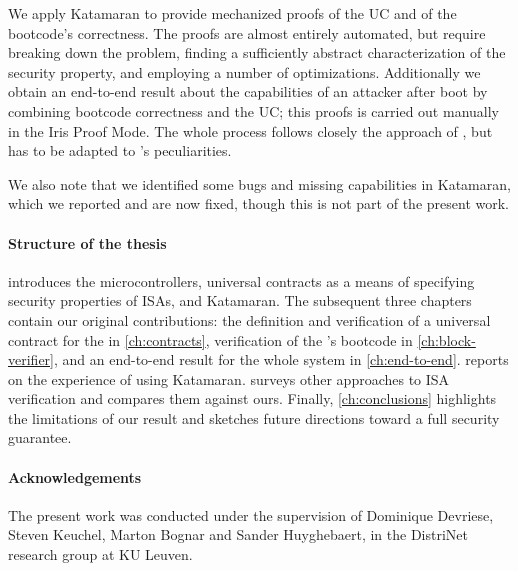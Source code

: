 We apply Katamaran to provide mechanized proofs of the UC and of the \msp bootcode's correctness. The proofs are almost entirely automated, but require breaking down the problem, finding a sufficiently abstract characterization of the security property, and employing a number of optimizations. Additionally we obtain an end-to-end result about the capabilities of an attacker after boot by combining bootcode correctness and the UC; this proofs is carried out manually in the Iris Proof Mode. The whole process follows closely the approach of \cite{Huyghebaert2023}, but has to be adapted to \msp's peculiarities.

We also note that we identified some bugs and missing capabilities in Katamaran, which we reported and are now fixed, though this is not part of the present work.


\paragraph{Structure of the thesis}

 introduces the \msp microcontrollers, universal contracts as a means of specifying security properties of ISAs, and Katamaran. The subsequent three chapters contain our original contributions: the definition and verification of a universal contract for the \msp in \cref{ch:contracts}, verification of the \msp's bootcode in \cref{ch:block-verifier}, and an end-to-end result for the whole system in \cref{ch:end-to-end}.  reports on the experience of using Katamaran.  surveys other approaches to ISA verification and compares them against ours. Finally, \cref{ch:conclusions} highlights the limitations of our result and sketches future directions toward a full security guarantee.

\paragraph{Acknowledgements}

The present work was conducted under the supervision of \prof Dominique Devriese, \dr Steven Keuchel, \dr Marton Bognar and Sander Huyghebaert, in the DistriNet research group at KU Leuven.
